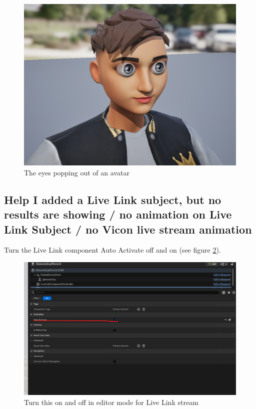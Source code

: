 \documentclass{uva-inf-article}
\begin{document}
\begin{figure}[hbt!]
    \centering
    \includegraphics[width=\textwidth]{imgs/eye-pop-out.png}
    \caption{The eyes popping out of an avatar}
    \label{fig:eyepopout}
\end{figure}

\subsection{Help I added a Live Link subject, but no results are showing / no animation on Live Link Subject / no Vicon live stream animation}
Turn the Live Link component Auto Activate off and on (see figure \ref{fig:liveLinkAutoactivate}).

\begin{figure}[hbt!]
    \centering
    \includegraphics[width=\textwidth]{imgs/autoactivate.png}
    \caption{Turn this on and off in editor mode for Live Link stream}
    \label{fig:liveLinkAutoactivate}
\end{figure}
\end{document}
